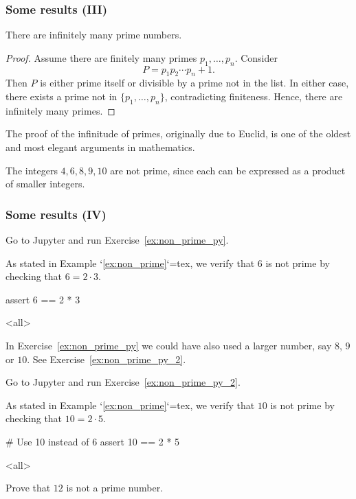 \documentclass{beamerunicatt}
\begin{document}
\begin{frame}
\frametitle{Some results (III)}
\begin{proposition}
There are infinitely many prime numbers.
\end{proposition}

\begin{proof}
Assume there are finitely many primes \(p_1,\dots,p_n\). Consider
\[
P = p_1 p_2 \cdots p_n + 1.
\]
Then \(P\) is either prime itself or divisible by a prime not in the list. In either case, there exists a prime not in \(\{p_1,\dots,p_n\}\), contradicting finiteness. Hence, there are infinitely many primes.
\end{proof}

\begin{remark}[Euclid]
The proof of the infinitude of primes, originally due to Euclid, is one of the oldest and most elegant arguments in mathematics.
\end{remark}

\begin{example}
The integers $4, 6, 8, 9, 10$ are not prime, since each can be expressed as a product of smaller integers.
\label{ex:non_prime}
\end{example}
\end{frame}

\begin{frame}[fragile]
\frametitle{Some results (IV)}
\begin{pyexercise}{Go to Jupyter and run Exercise~\ref{ex:non_prime_py}.}
\begin{mdcell}
As stated in Example `\ref{ex:non_prime}`{=tex}, we verify that $6$ is not prime by checking that $6 = 2 \cdot 3$.
\end{mdcell}
\begin{pycell}
assert 6 == 2 * 3
\end{pycell}
\mode<all>
\label{ex:non_prime_py}
\end{pyexercise}

\begin{remark}
In Exercise~\ref{ex:non_prime_py} we could have also used a larger number, say $8$, $9$ or $10$. See Exercise~\ref{ex:non_prime_py_2}.
\end{remark}

\begin{pyexercise}{Go to Jupyter and run Exercise~\ref{ex:non_prime_py_2}.}
\begin{mdcell}
As stated in Example `\ref{ex:non_prime}`{=tex}, we verify that $10$ is not prime by checking that $10 = 2 \cdot 5$.
\end{mdcell}
\begin{pycell}
# Use 10 instead of 6
assert 10 == 2 * 5
\end{pycell}
\mode<all>
\label{ex:non_prime_py_2}
\end{pyexercise}

\begin{homework}
Prove that $12$ is not a prime number.
\end{homework}

\end{frame}
\end{document}
